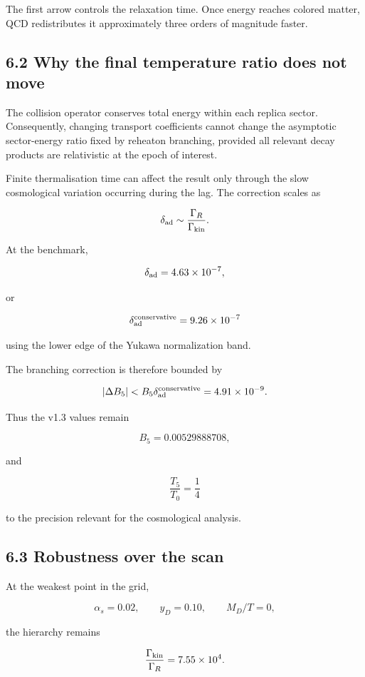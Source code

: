 \documentclass[
  10pt,
]{article}
\begin{document}
The first arrow controls the relaxation time. Once energy reaches
colored matter, QCD redistributes it approximately three orders of
magnitude faster.

\subsection{6.2 Why the final temperature ratio does not
move}\label{why-the-final-temperature-ratio-does-not-move}

The collision operator conserves total energy within each replica
sector. Consequently, changing transport coefficients cannot change the
asymptotic sector-energy ratio fixed by reheaton branching, provided all
relevant decay products are relativistic at the epoch of interest.

Finite thermalisation time can affect the result only through the slow
cosmological variation occurring during the lag. The correction scales
as

\[
\delta_{\rm ad}
\sim
\frac{\Gamma_R}{\Gamma_{\rm kin}}.
\]

At the benchmark,

\[
\delta_{\rm ad}=4.63\times10^{-7},
\]

or

\[
\delta_{\rm ad}^{\rm conservative}=9.26\times10^{-7}
\]

using the lower edge of the Yukawa normalization band.

The branching correction is therefore bounded by

\[
|\Delta B_5|
<
B_5\delta_{\rm ad}^{\rm conservative}
=
4.91\times10^{-9}.
\]

Thus the v1.3 values remain

\[
\boxed{
B_5=0.00529888708,
}
\]

and

\[
\boxed{
\frac{T_5}{T_0}=\frac14
}
\]

to the precision relevant for the cosmological analysis.

\subsection{6.3 Robustness over the
scan}\label{robustness-over-the-scan}

At the weakest point in the grid,

\[
\alpha_s=0.02,
\qquad
y_D=0.10,
\qquad
M_D/T=0,
\]

the hierarchy remains

\[
\frac{\Gamma_{\rm kin}}{\Gamma_R}
=7.55\times10^4.
\]
\end{document}
